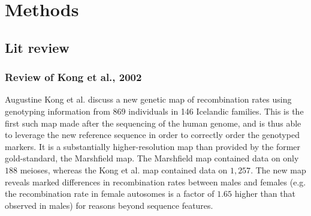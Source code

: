 \chapter{Methods}
\label{ch:methods}

\section{Lit review}
\subsection{Review of Kong et al., 2002}

Augustine Kong et al. discuss a new genetic map of recombination rates using genotyping information from $869$ individuals in 146 Icelandic families.  This is the first such map made after the sequencing of the human genome, and is thus able to leverage the new reference sequence in order to correctly order the genotyped markers.  It is a substantially higher-resolution map than provided by the former gold-standard, the Marshfield map.  The Marshfield map contained data on only $188$ meioses, whereas the Kong et al. map contained data on $1,257$.  The new map reveals marked differences in recombination rates between males and females (e.g. the recombination rate in female autosomes is a factor of $1.65$ higher than that observed in males) for reasons beyond sequence features.

